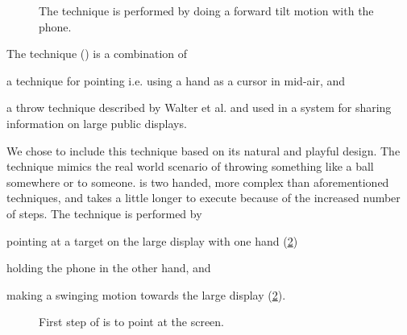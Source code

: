 \begin{figure}[H]
\caption{
	\protect{} The \tilt technique is performed by doing a forward tilt motion with the phone.
}
\label{fig:tiltTechnique}
\end{figure}

The \throw technique () is a combination of  
\begin{enumerate*}[label=\itshape\alph*\upshape)]
	\item{a technique for pointing \cite{Scheible:2008} i.e. using a hand as a cursor in mid-air, and}
	\item{a throw technique described by Walter et al. \cite{Walter:2014} and used in a system for sharing information on large public displays.}
\end{enumerate*}
We chose to include this technique based on its natural and playful design.
The technique mimics the real world scenario of throwing something like a ball somewhere or to someone.
\throw is two handed, more complex than aforementioned techniques, and takes a little longer to execute because of the increased number of steps.
The \throw technique is performed by 
\begin{enumerate*}[label=\itshape\roman*\upshape)]
	\item{pointing at a target on the large display with one hand (\cref{fig:throwTechnique})} 
	\item{holding the phone in the other hand, and}
	\item{making a swinging motion towards the large display (\cref{fig:throwTechnique}).}
\end{enumerate*}

\begin{figure}[H]
\caption{
	\protect{} First step of \throw is to point at the screen.
}
\label{fig:throwTechnique}
\end{figure}


